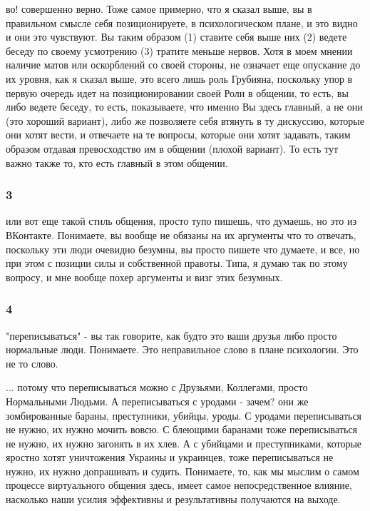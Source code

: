 во! совершенно верно. Тоже самое примерно, что я сказал выше, вы в правильном
смысле себя позиционируете, в психологическом плане, и это видно и они это
чувствуют. Вы таким образом (1) ставите себя выше них (2) ведете беседу по
своему усмотрению (3) тратите меньше нервов. Хотя в моем мнении наличие матов
или оскорблений со своей стороны, не означает еще опускание до их уровня, как я
сказал выше, это всего лишь роль Грубияна, поскольку упор в первую очередь идет
на позиционировании своей Роли в общении, то есть, вы либо ведете беседу, то
есть, показываете, что именно Вы здесь главный, а не они (это хороший вариант),
либо же позволяете себя втянуть в ту дискуссию, которые они хотят вести, и
отвечаете на те вопросы, которые они хотят задавать, таким образом отдавая
превосходство им в общении (плохой вариант). То есть тут важно также то, кто
есть главный в этом общении.

\subsubsection{3}

или вот еще такой стиль общения, просто тупо пишешь, что думаешь, но это из
ВКонтакте. Понимаете, вы вообще не обязаны на их аргументы что то отвечать,
поскольку эти люди очевидно безумны, вы просто пишете что думаете, и все, но
при этом с позиции силы и собственной правоты. Типа, я думаю так по этому
вопросу, и мне вообще похер аргументы и визг этих безумных.

\subsubsection{4}

"переписываться" - вы так говорите, как будто это ваши друзья либо просто
нормальные люди. Понимаете. Это неправильное слово в плане психологии. Это не
то слово.

... потому что переписываться можно с Друзьями, Коллегами, просто Нормальными
Людьми. А переписываться с уродами - зачем? они же зомбированные бараны,
преступники, убийцы, уроды. С уродами переписываться не нужно, их нужно мочить
вовсю. С блеющими баранами тоже переписываться не нужно, их нужно загонять в их
хлев. А с убийцами и преступниками, которые яростно хотят уничтожения Украины и
украинцев, тоже переписываться не нужно, их нужно допрашивать и судить.
Понимаете, то, как мы мыслим о самом процессе виртуального общения здесь, имеет
самое непосредственное влияние, насколько наши усилия эффективны и
результативны получаются на выходе.



